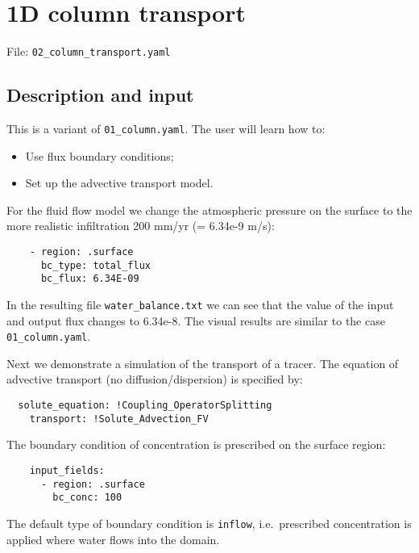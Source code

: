 \section{1D column transport}\label{d-column-transport}

File: \texttt{02\_column\_transport.yaml}

\subsection{Description and input}\label{description-and-input}

This is a variant of \texttt{01\_column.yaml}. The user will learn how
to:

\begin{itemize}
\tightlist
\item
  Use flux boundary conditions;
\item
  Set up the advective transport model.
\end{itemize}

For the fluid flow model we change the atmospheric pressure on the
surface to the more realistic infiltration 200 mm/yr (= 6.34e-9 m/s):

\begin{verbatim}
    - region: .surface
      bc_type: total_flux
      bc_flux: 6.34E-09
\end{verbatim}

In the resulting file \texttt{water\_balance.txt} we can see that the
value of the input and output flux changes to 6.34e-8. The visual
results are similar to the case \texttt{01\_column.yaml}.

Next we demonstrate a simulation of the transport of a tracer. The
equation of advective transport (no diffusion/dispersion) is specified
by:

\begin{verbatim}
  solute_equation: !Coupling_OperatorSplitting
    transport: !Solute_Advection_FV
\end{verbatim}

The boundary condition of concentration is prescribed on the surface
region:

\begin{verbatim}
    input_fields:
      - region: .surface
        bc_conc: 100
\end{verbatim}

The default type of boundary condition is \texttt{inflow},
i.e.~prescribed concentration is applied where water flows into the
domain.

